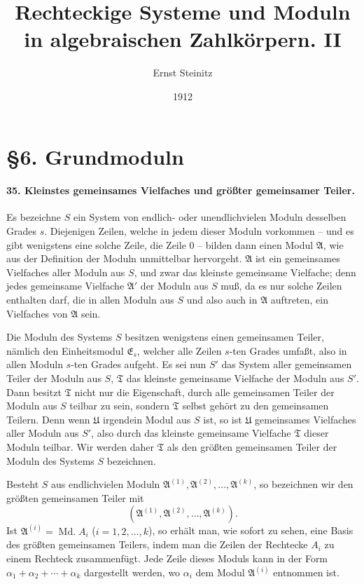 \documentclass[11pt]{article}
\title{Rechteckige Systeme und Moduln in algebraischen Zahlk\"orpern. II}
\author{Ernst Steinitz}
\date{1912}
\newcommand{\Md}{\operatorname{Md.}}
\begin{document}
\maketitle

\section*{\S 6. Grundmoduln}

\paragraph{35. Kleinstes gemeinsames Vielfaches und größter gemeinsamer Teiler.}
Es bezeichne $S$ ein System von endlich- oder unendlichvielen Moduln desselben Grades $s$. Diejenigen Zeilen, welche in jedem dieser Moduln vorkommen -- und es gibt wenigstens eine solche Zeile, die Zeile $0$ -- bilden dann einen Modul $\mathfrak A$, wie aus der Definition der Moduln unmittelbar hervorgeht. $\mathfrak A$ ist ein gemeinsames Vielfaches aller Moduln aus $S$, und zwar das kleinste gemeinsame Vielfache; denn jedes gemeinsame Vielfache $\mathfrak A'$ der Moduln aus $S$ muß, da es nur solche Zeilen enthalten darf, die in allen Moduln aus $S$ und also auch in $\mathfrak A$ auftreten, ein Vielfaches von $\mathfrak A$ sein.

Die Moduln des Systems $S$ besitzen wenigstens einen gemeinsamen Teiler, nämlich den Einheitsmodul $\mathfrak E_s$, welcher alle Zeilen $s$-ten Grades umfaßt, also in allen Moduln $s$-ten Grades aufgeht. Es sei nun $S'$ das System aller gemeinsamen Teiler der Moduln aus $S$, $\mathfrak T$ das kleinste gemeinsame Vielfache der Moduln aus $S'$. Dann besitzt $\mathfrak T$ nicht nur die Eigenschaft, durch alle gemeinsamen Teiler der Moduln aus $S$ teilbar zu sein, sondern $\mathfrak T$ selbst gehört zu den gemeinsamen Teilern. Denn wenn $\mathfrak U$ irgendein Modul aus $S$ ist, so ist $\mathfrak U$ gemeinsames Vielfaches aller Moduln aus $S'$, also durch das kleinste gemeinsame Vielfache $\mathfrak T$ dieser Moduln teilbar. Wir werden daher $\mathfrak T$ als den größten gemeinsamen Teiler der Moduln des Systems $S$ bezeichnen.

Besteht $S$ aus endlichvielen Moduln $\mathfrak A^{(1)},\mathfrak A^{(2)},\ldots,\mathfrak A^{(k)}$, so bezeichnen wir den größten gemeinsamen Teiler mit
\[
(\mathfrak A^{(1)},\mathfrak A^{(2)},\ldots,\mathfrak A^{(k)}).
\]
Ist $\mathfrak A^{(i)}=\Md A_i$ ($i=1,2,\ldots,k$), so erhält man, wie sofort zu sehen, eine Basis des größten gemeinsamen Teilers, indem man die Zeilen der Rechtecke $A_i$ zu einem Rechteck zusammenfügt. Jede Zeile dieses Moduls kann in der Form $\alpha_1+\alpha_2+\cdots+\alpha_k$ dargestellt werden, wo $\alpha_i$ dem Modul $\mathfrak A^{(i)}$ entnommen ist.
\end{document}
